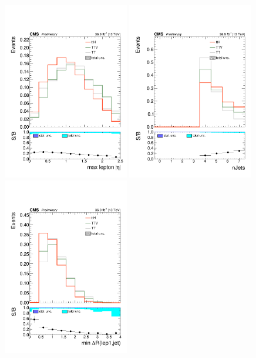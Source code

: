 \begin{figure}[htp]
\centering
\includegraphics[width=0.49\textwidth]{ch9_figs/kinMVA_input_max_Lep_eta.pdf}
\includegraphics[width=0.49\textwidth]{ch9_figs/kinMVA_input_numJets.pdf}\\
\includegraphics[width=0.49\textwidth]{ch9_figs/kinMVA_input_mindr_lep1_jet.pdf}

\end{figure}
